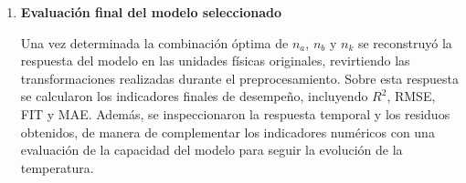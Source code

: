 \documentclass[11pt]{report}
\begin{document}
\begin{enumerate}
    Debido a que ningún indicador individual permite evaluar completamente la calidad de un modelo dinámico, las estructuras candidatas fueron ordenadas mediante una función de costo que considera simultáneamente su desempeño en validación, el error de simulación, la complejidad, las propiedades de los residuos y la estabilidad. De esta manera, la selección no corresponde necesariamente al modelo con el menor RMSE o el mayor FIT de manera aislada, sino a la estructura que presenta el mejor equilibrio entre precisión, capacidad de generalización, complejidad y consistencia dinámica.



    \item \textbf{Evaluación final del modelo seleccionado}

    Una vez determinada la combinación óptima de $n_{a}$, $n_{b}$ y $n_{k}$ se reconstruyó la respuesta del modelo en las unidades físicas originales, revirtiendo las transformaciones realizadas durante el preprocesamiento. Sobre esta respuesta se calcularon los indicadores finales de desempeño, incluyendo $R^2$, RMSE, FIT y MAE. Además, se inspeccionaron la respuesta temporal y los residuos obtenidos, de manera de complementar los indicadores numéricos con una evaluación de la capacidad del modelo para seguir la evolución de la temperatura.


    
\end{enumerate}

\end{document}
